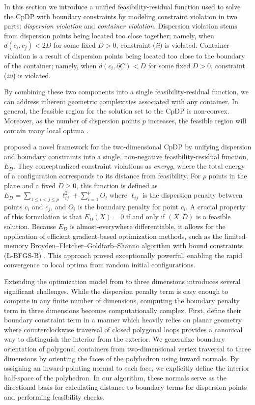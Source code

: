 \documentclass[preprint,12pt]{elsarticle}
\theoremstyle{remark}
\begin{document}
In this section we introduce a unified feasibility-residual function used to
solve the CpDP with boundary constraints by modeling constraint violation in two
parts: \textit{dispersion violation} and \textit{container violation}.
Dispersion violation stems from dispersion points being located too close
together; namely, when $d(c_i, c_j) < 2D$ for some fixed $D > 0$, constraint
(\textit{ii}) is violated. Container violation is a result of dispersion points
being located too close to the boundary of the container; namely, when $d(c_i,
\partial C) < D$ for some fixed $D > 0$, constraint (\textit{iii}) is violated.

By combining these two components into a single feasibility-residual function,
we can address inherent geometric complexities associated with any container. In
general, the feasible region for the solution set to the CpDP is non-convex.
Moreover, as the number of dispersion points $p$ increases, the feasible region
will contain many local optima \citep{lai2024}.

\citet{lai2024} proposed a novel framework for the two-dimensional CpDP by
unifying dispersion and boundary constraints into a single, non-negative
feasibility-residual function, $E_D$. They conceptualized constraint violations
as \textit{energy}, where the total energy of a configuration corresponds to its
distance from feasibility. For $p$ points in the plane and a fixed $D \ge 0$,
this function is defined as $\displaystyle{E_D = \sum_{1 \le i < j \le p}
\ell^2_{ij} + \sum_{i = 1}^p O_i}$ where $\ell_{ij}$ is the dispersion penalty
between points $c_i$ and $c_j$, and $O_i$ is the boundary penalty for point
$c_i$. A crucial property of this formulation is that $E_D(X) = 0$ if and only
if $(X, D)$ is a feasible solution. Because $E_D$ is almost-everywhere
differentiable, it allows for the application of efficient gradient-based
optimization methods, such as the limited-memory
Broyden--Fletcher--Goldfarb--Shanno algorithm with bound constraints (L-BFGS-B)
\citep{fletcher1987, byrd1995}. This approach proved exceptionally powerful,
enabling the rapid convergence to local optima from random initial
configurations.

Extending the optimization model from \citet{lai2024} to three dimensions
introduces several significant challenges. While the dispersion penalty term is
easy enough to compute in any finite number of dimensions, computing the
boundary penalty term in three dimensions becomes computationally complex.
First, \citet{lai2024} define their boundary constraint term in a manner which
heavily relies on planar geometry where counterclockwise traversal of closed
polygonal loops provides a canonical way to distinguish the interior from the
exterior. We generalize boundary orientation of polygonal containers from
two-dimensional vertex traversal to three dimensions by orienting the faces of
the polyhedron using inward normals. By assigning an inward-pointing normal to
each face, we explicitly define the interior half-space of the polyhedron. In
our algorithm, these normals serve as the directional basis for calculating
distance-to-boundary terms for dispersion points and performing feasibility
checks.
\end{document}
